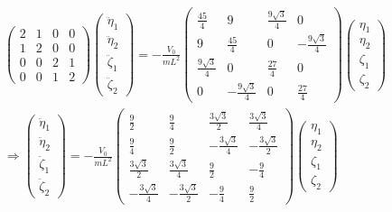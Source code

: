 \documentclass[12pt]{article}
\begin{document}
\begin{align*}
	\begin{pmatrix}
		2 & 1 & 0 & 0 \\
		1 & 2 & 0 & 0 \\
		0 & 0 & 2 & 1 \\
		0 & 0 & 1 & 2 
	\end{pmatrix}
	\begin{pmatrix}
		\ddot{\eta}_1 \\
		\ddot{\eta}_2 \\
		\ddot{\zeta}_1 \\
		\ddot{\zeta}_2
	\end{pmatrix}
    = - \frac{V_0}{m L^2}
    \begin{pmatrix}
    	\frac{45}{4} & 9 & \frac{9\sqrt{3}}{4} & 0 \\
    	9 & \frac{45}{4} & 0 & - \frac{9\sqrt{3}}{4} \\
    	\frac{9\sqrt{3}}{4} & 0 & \frac{27}{4} & 0 \\
    	0 & - \frac{9\sqrt{3}}{4} & 0 & \frac{27}{4}
    \end{pmatrix}	
    \begin{pmatrix}
    	\eta_1 \\
    	\eta_2 \\
    	\zeta_1 \\
    	\zeta_2
    \end{pmatrix}
\\ \Rightarrow
   \begin{pmatrix}
   	\ddot{\eta}_1 \\
   	\ddot{\eta}_2 \\
   	\ddot{\zeta}_1 \\
   	\ddot{\zeta}_2
   \end{pmatrix}
    = - \frac{V_0}{m L^2}
    \begin{pmatrix}
    	\frac{9}{2} & \frac{9}{4} & \frac{3\sqrt{3}}{2} & \frac{3\sqrt{3}}{4} \\
    	\frac{9}{4} & \frac{9}{2} & -\frac{3\sqrt{3}}{4} & -\frac{3\sqrt{3}}{2} \\
    	\frac{3\sqrt{3}}{2} & \frac{3\sqrt{3}}{4} & \frac{9}{2} & -\frac{9}{4} \\
    	-\frac{3\sqrt{3}}{4} & - \frac{3\sqrt{3}}{2} & -\frac{9}{4} & \frac{9}{2}
    \end{pmatrix}
    \begin{pmatrix}
    	\eta_1 \\
    	\eta_2 \\
    	\zeta_1 \\
    	\zeta_2
    \end{pmatrix}
\end{align*}
\end{document}
